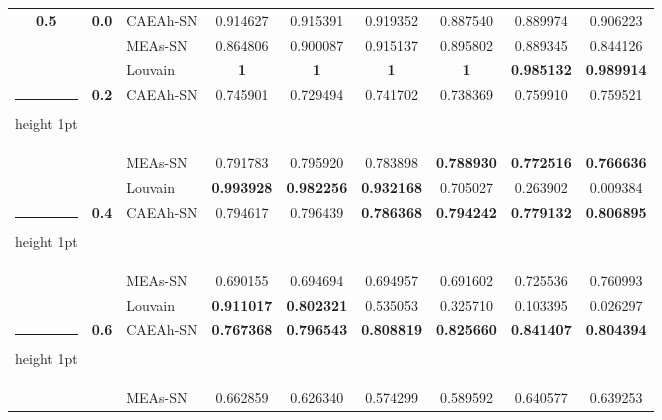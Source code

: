 \documentclass[10pt, journal]{IEEEtran}
\makeatletter
\newcommand{\thickhline}{%
    \noalign {\ifnum 0=`}\fi \hrule height 1pt
    \futurelet \reserved@a \@xhline
}
\makeatother
\begin{document}
\begin{table}[!htbp]
\begin{tabular}{|c|c|l|c|c|c|c|c|c|}
\multirow{3}{*}{\textbf{0.5}} & \multirow{3}{*}{\textbf{0.0}} & CAEAh-SN & 0.914627          & 0.915391          & 0.919352          & 0.887540           & 0.889974          & 0.906223          \\ \cline{3-9}
                              &                               & MEAs-SN & 0.864806          & 0.900087          & 0.915137          & 0.895802          & 0.889345          & 0.844126          \\ \cline{3-9}
                              &                               & Louvain  & \textbf{1}        & \textbf{1}        & \textbf{1}        & \textbf{1}        & \textbf{0.985132} & \textbf{0.989914} \\ \thickhline
\multirow{3}{*}{\textbf{0.5}} & \multirow{3}{*}{\textbf{0.2}} & CAEAh-SN & 0.745901          & 0.729494          & 0.741702          & 0.738369          & 0.759910           & 0.759521          \\ \cline{3-9}
                              &                               & MEAs-SN & 0.791783          & 0.795920           & 0.783898          & \textbf{0.788930}  & \textbf{0.772516} & \textbf{0.766636} \\ \cline{3-9}
                              &                               & Louvain  & \textbf{0.993928} & \textbf{0.982256} & \textbf{0.932168} & 0.705027          & 0.263902          & 0.009384        \\ \thickhline
\multirow{3}{*}{\textbf{0.5}} & \multirow{3}{*}{\textbf{0.4}} & CAEAh-SN & 0.794617          & 0.796439          & \textbf{0.786368} & \textbf{0.794242} & \textbf{0.779132} & \textbf{0.806895} \\ \cline{3-9}
                              &                               & MEAs-SN & 0.690155          & 0.694694          & 0.694957          & 0.691602          & 0.725536          & 0.760993          \\ \cline{3-9}
                              &                               & Louvain  & \textbf{0.911017} & \textbf{0.802321} & 0.535053          & 0.325710          & 0.103395          & 0.026297         \\ \thickhline
\multirow{3}{*}{\textbf{0.5}} & \multirow{3}{*}{\textbf{0.6}} & CAEAh-SN & \textbf{0.767368} & \textbf{0.796543} & \textbf{0.808819} & \textbf{0.825660}  & \textbf{0.841407} & \textbf{0.804394} \\ \cline{3-9}
                              &                               & MEAs-SN & 0.662859          & 0.626340           & 0.574299          & 0.589592          & 0.640577          & 0.639253          \\ \cline{3-9}

\end{tabular}
\end{table}
\end{document}
